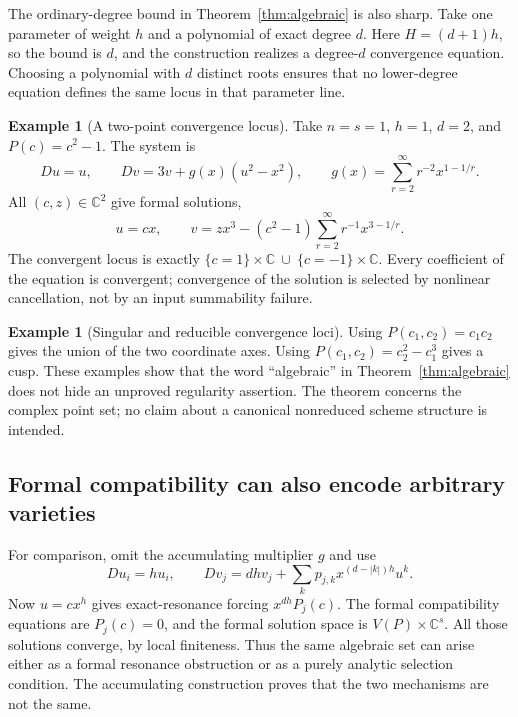\documentclass[11pt,a4paper]{article}
\numberwithin{equation}{section}
\theoremstyle{definition}
\newtheorem{example}[theorem]{Example}
\theoremstyle{remark}
\newcommand{\C}{\mathbb C}
\begin{document}
The ordinary-degree bound in Theorem~\ref{thm:algebraic} is also sharp.
Take one parameter of weight $h$ and a polynomial of exact degree $d$.
Here $H=(d+1)h$, so the bound is $d$, and the construction realizes a
degree-$d$ convergence equation. Choosing a polynomial with $d$ distinct
roots ensures that no lower-degree equation defines the same locus
in that parameter line.

\begin{example}[A two-point convergence locus]
Take $n=s=1$, $h=1$, $d=2$, and $P(c)=c^2-1$. The system is
\begin{equation}\label{eq:two-points}
 Du=u,\qquad Dv=3v+g(x)(u^2-x^2),\qquad
 g(x)=\sum_{r=2}^{\infty}r^{-2}x^{1-1/r}.
\end{equation}
All $(c,z)\in\C^2$ give formal solutions,
\[
 u=cx,\qquad v=zx^3-(c^2-1)\sum_{r=2}^{\infty}r^{-1}x^{3-1/r}.
\]
The convergent locus is exactly
$\{c=1\}\times\C\ \cup\ \{c=-1\}\times\C$.
Every coefficient of the equation is convergent; convergence of the
solution is selected by nonlinear cancellation, not by an input
summability failure.
\end{example}

\begin{example}[Singular and reducible convergence loci]
Using $P(c_1,c_2)=c_1c_2$ gives the union of the two coordinate axes.
Using $P(c_1,c_2)=c_2^2-c_1^3$ gives a cusp. These examples show that the
word ``algebraic'' in Theorem~\ref{thm:algebraic} does not hide an
unproved regularity assertion. The theorem concerns the complex point
set; no claim about a canonical nonreduced scheme structure is intended.
\end{example}

\subsection{Formal compatibility can also encode arbitrary varieties}
For comparison, omit the accumulating multiplier $g$ and use
\begin{equation}\label{eq:formal-univ}
 Du_i=h u_i,\qquad
 Dv_j=dh v_j+\sum_kp_{j,k}x^{(d-|k|)h}u^k.
\end{equation}
Now $u=cx^h$ gives exact-resonance forcing $x^{dh}P_j(c)$.
The formal compatibility equations are $P_j(c)=0$, and the formal solution
space is $V(P)\times\C^s$. All those solutions converge, by local
finiteness. Thus the same algebraic set can arise either as a formal
resonance obstruction or as a purely analytic selection condition. The
accumulating construction proves that the two mechanisms are not the same.
\end{document}
